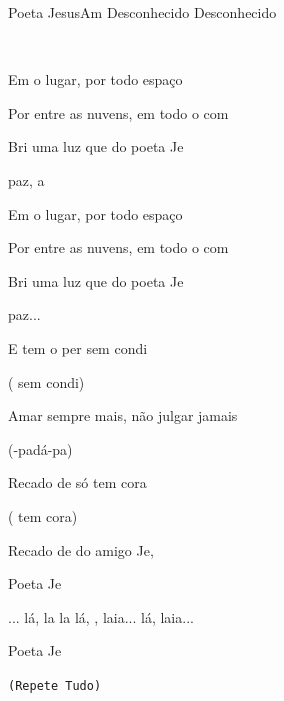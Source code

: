 \documentclass[a4,12pt,oneside]{book}
\newcommand{\RevDate}{\today}
\newcommand{\NotCCLIed}{\relax}
\begin{document}
\begin{song}{Poeta Jesus}{Am}
  {Desconhecido}
  {Desconhecido}
  {}
  {\NotCCLIed}

	\renewcommand{\RevDate}{21 de maio de 2015}

	
	\ifChordBk
	{\vspace{-2em}\flushright{\Dmchord \quad \Gschord \quad \Cchord \quad \Aschord \quad \Gchord \quad \Gsuschord \\
	
		~\\
		
		\quad \Emchord \quad \Amchord \quad \Ddimchord \\
		
		~\\

		\quad \Csusmchord
	}\\}
	
	\vspace{-18ex}
	\fi
	
	\begin{SBVerse*}
		Em  o lugar, por todo  espaço

		Por entre as nuvens, em todo o com

		Bri uma luz que  do poeta Je

		 paz, a  \quad ~
		      
		Em  o lugar, por todo  espaço

		Por entre as nuvens, em todo o com

		Bri uma luz que  do poeta Je

		 paz...

		E tem o per sem condi 

		( sem condi)

		Amar sempre mais, não julgar jamais
		   
		(-padá-pa)
		                     
		Recado de  só tem cora

		( tem cora)

		Recado de  do amigo Je,

		Poeta Je

		... lá, la la lá, , laia...  lá, laia...

		Poeta Je	~ 
	\end{SBVerse*}
	
	\begin{SBVerse*}
		\small\texttt{(Repete Tudo)}
	\end{SBVerse*}
\end{song} 
\end{document}
